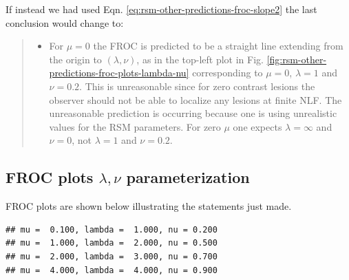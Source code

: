 \documentclass[
]{book}
\providecommand{\tightlist}{%
  \setlength{\itemsep}{0pt}\setlength{\parskip}{0pt}}
\begin{document}
If instead we had used Eqn. \eqref{eq:rsm-other-predictions-froc-slope2} the last conclusion would change to:

\begin{quote}
\begin{itemize}
\tightlist
\item
  For \(\mu = 0\) the FROC is predicted to be a straight line extending from the origin to \((\lambda, \nu)\), as in the top-left plot in Fig. \ref{fig:rsm-other-predictions-froc-plots-lambda-nu} corresponding to \(\mu=0\), \(\lambda = 1\) and \(\nu = 0.2\). This is unreasonable since for zero contrast lesions the observer should not be able to localize any lesions at finite NLF. The unreasonable prediction is occurring because one is using unrealistic values for the RSM parameters. For zero \(\mu\) one expects \(\lambda = \infty\) and \(\nu = 0\), not \(\lambda = 1\) and \(\nu = 0.2\).
\end{itemize}
\end{quote}

\hypertarget{froc-plots-lambda-nu-parameterization}{%
\subsection{\texorpdfstring{FROC plots \(\lambda, \nu\) parameterization}{FROC plots \textbackslash lambda, \textbackslash nu parameterization}}\label{froc-plots-lambda-nu-parameterization}}

FROC plots are shown below illustrating the statements just made.

\begin{verbatim}
## mu =  0.100, lambda =  1.000, nu = 0.200 
## mu =  1.000, lambda =  2.000, nu = 0.500 
## mu =  2.000, lambda =  3.000, nu = 0.700 
## mu =  4.000, lambda =  4.000, nu = 0.900
\end{verbatim}
\end{document}
